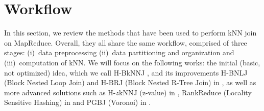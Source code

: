 \section{Workflow}
In this section, we review the methods that have been used to perform kNN join on MapReduce. Overall, they all share the same 
workflow, comprised of three stages: (i)~data preprocessing (ii)~data partitioning and organization 
and (iii)~computation of kNN. We will focus on the 
following works: the initial (basic, not optimized) idea, which we 
call H-BkNNJ 
, and its improvements H-BNLJ (Block Nested Loop Join) and H-BRJ (Block Nested R-Tree Join) in \cite{Zhang:2012:EPK:2247596.2247602}, as well as more advanced 
solutions such as 
H-$z$kNNJ (z-value) in \cite{Zhang:2012:EPK:2247596.2247602}, RankReduce (Locality Sensitive Hashing) in \cite{Stupar10rankreduce-} and PGBJ (Voronoi) in \cite{Lu:2012:EPK:
2336664.2336674}. 


%


%
